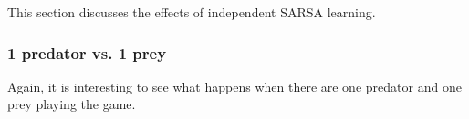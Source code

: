 This section discusses the effects of independent SARSA learning.
\subsubsection{1 predator vs. 1 prey}
Again, it is interesting to see what happens when there are one predator and one prey playing the game. 